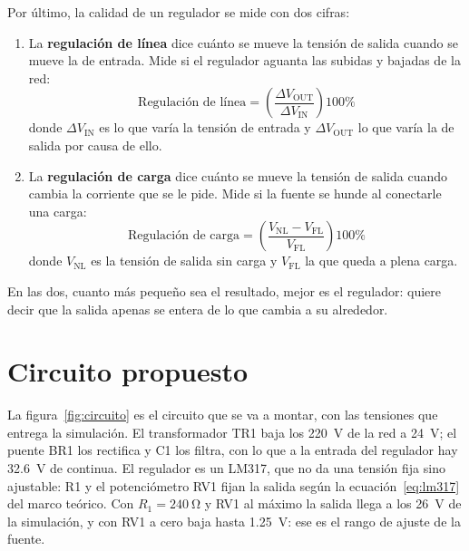\documentclass[11pt,a4paper]{article}
\begin{document}
Por último, la calidad de un regulador se mide con dos cifras:

\begin{enumerate}[label=\textbf{\alph*)}, leftmargin=*, labelsep=0.6em]
\item La \textbf{regulación de línea} dice cuánto se mueve la tensión de salida cuando se
mueve la de entrada. Mide si el regulador aguanta las subidas y bajadas de la red:
\begin{equation}
  \text{Regulación de línea}=\left(\frac{\Delta V_{\text{OUT}}}{\Delta V_{\text{IN}}}\right)100\%
\end{equation}
donde $\Delta V_{\text{IN}}$ es lo que varía la tensión de entrada y $\Delta V_{\text{OUT}}$
lo que varía la de salida por causa de ello.

\item La \textbf{regulación de carga} dice cuánto se mueve la tensión de salida cuando
cambia la corriente que se le pide. Mide si la fuente se hunde al conectarle una carga:
\begin{equation}
  \text{Regulación de carga}=\left(\frac{V_{\text{NL}}-V_{\text{FL}}}{V_{\text{FL}}}\right)100\%
\end{equation}
donde $V_{\text{NL}}$ es la tensión de salida sin carga y $V_{\text{FL}}$ la que queda a
plena carga.
\end{enumerate}

En las dos, cuanto más pequeño sea el resultado, mejor es el regulador: quiere decir que la
salida apenas se entera de lo que cambia a su alrededor.

\FloatBarrier
\section{Circuito propuesto}
La figura~\ref{fig:circuito} es el circuito que se va a montar, con las tensiones que
entrega la simulación. El transformador TR1 baja los \qty{220}{\volt} de la red a
\qty{24}{\volt}; el puente BR1 los rectifica y C1 los filtra, con lo que a la entrada del
regulador hay \qty{32.6}{\volt} de continua. El regulador es un LM317, que no da una
tensión fija sino ajustable: R1 y el potenciómetro RV1 fijan la salida según la
ecuación~\eqref{eq:lm317} del marco teórico.
Con $R_1=\qty{240}{\ohm}$ y RV1 al máximo la salida llega a los \qty{26}{\volt} de la
simulación, y con RV1 a cero baja hasta \qty{1.25}{\volt}: ese es el rango de ajuste de la
fuente.
\end{document}
